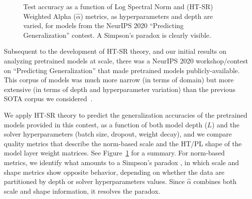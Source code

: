 \documentclass{article}
\begin{document}
%
%

\begin{figure}[t!] 
\vspace{-4mm}
    \centering
\vspace{-4mm}
    \caption{Test accuracy as a function of 
             Log Spectral Norm and 
             (HT-SR) Weighted Alpha ($\hat{\alpha}$) metrics,
             as hyperparameters and depth are varied, for 
             models from the NeurIPS 2020 ``Predicting Generalization'' contest.
             A Simpson's paradox is clearly visible.
            }
    \label{fig:simpsons}
\end{figure} 

Subsequent to the development of HT-SR theory, and our initial results on analyzing pretrained models at scale, there was a NeurIPS 2020 workshop/contest on ``Predicting Generalization'' 
\cite{JNBx19_fantastic_TR, JFYx20_contest_v10} that made pretrained models publicly-available. 
This corpus of models was much more narrow (in terms of domain) but more extensive (in terms of depth and hyperparameter variation) than the previous SOTA corpus we considered~\cite{osmr}.

We apply HT-SR theory to predict the generalization accuracies of the pretrained models provided in this contest, as a function of both model depth ($L$) and the solver hyperparameters (batch size, dropout, weight decay), and we compare quality metrics that describe the norm-based scale and the HT/PL shape of the model layer weight matrices.  
See Figure~\ref{fig:simpsons} for a summary.
For norm-based metrics, we identify what amounts to a Simpson’s paradox \cite{BHO75}, in which scale and shape metrics show opposite behavior, depending on whether the data are partitioned by depth or solver hyperparameters values.
Since $\hat{\alpha}$ combines both scale and shape information, it resolves the paradox.
\end{document}
